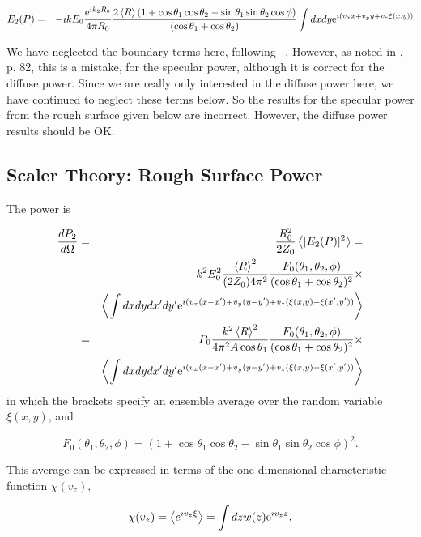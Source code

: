 \documentclass[11pt]{article}
\newcommand{\der}[2]{\frac{d {#1}}{d {#2}}}
\newcommand{\e}{{\rm e}}
\begin{document}
{{{{\begin{eqnarray}
E_{2}(P)&=&-\imath kE_{0}\frac{\e^{\imath k_{2}R_{0}}}{4\pi R_{0}}\frac{2\left<R\right>\left(1+\cos\theta_{1}\cos\theta_{2}-\sin\theta_{1}\sin\theta_{2}\cos\phi\right)}{(\cos{\theta_{1}}+\cos{\theta_{2}})}\int dx dy\e^{\imath( v_{x}x+v_{y}y+v_{z}\xi(x,y))}
\end{eqnarray}

We have neglected the boundary terms here, following
~\cite{b:beckmann}. However, as noted in \cite{b:ogilvy}, p. 82, this is a
mistake, for the specular power, although it is correct for the
diffuse power. Since we are really only interested in the diffuse
power here, we have continued to neglect these terms below. So the
results for the specular power from the rough surface given below are
incorrect. However, the diffuse power results should be OK.

\subsection{Scaler Theory: Rough Surface Power} 

The power is

\begin{eqnarray}
\der{P_{2}}{\Omega}&=&\frac{R_{0}^{2}}{2Z_{0}}\left<|E_{2}(P)|^{2}\right>=\\
&&k^{2}E_{0}^{2}\frac{\left<R\right>^{2}}{(2Z_{0})4\pi^{2}}\frac{F_{0}(\theta_{1},\theta_{2},\phi)}{(\cos{\theta_{1}}+\cos{\theta_{2}})^{2}}\times\\
&&\left<\int dx dydx'dy'\e^{\imath( v_{x}(x-x')+v_{y}(y-y')+v_{z}(\xi(x,y)-\xi(x',y'))}\right>\\
&=&P_{0}\frac{k^{2}\left<R\right>^{2}}{4\pi^{2}A\cos\theta_{1}}\frac{F_{0}(\theta_{1},\theta_{2},\phi)}{(\cos{\theta_{1}}+\cos{\theta_{2}})^{2}}\times\\
&&\left<\int dx dydx'dy'\e^{\imath( v_{x}(x-x')+v_{y}(y-y')+v_{z}(\xi(x,y)-\xi(x',y'))}\right>\end{eqnarray}
in which the brackets specify an ensemble average over the random variable $\xi(x,y)$, and

$$F_{0}(\theta_{1},\theta_{2},\phi)=\left(1+\cos\theta_{1}\cos\theta_{2}-\sin\theta_{1}\sin\theta_{2}\cos\phi\right)^{2}.$$

This average can be expressed in terms of the one-dimensional characteristic function $\chi(v_{z}),$

$$\chi(v_{z})=\left<e^{\imath v_{z}\xi}\right>=\int dz w(z) \e^{\imath v_{z}z},$$

}}}}
\end{document}

